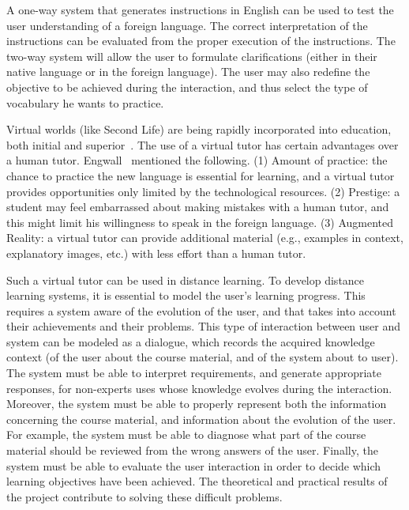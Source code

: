 A one-way system that generates instructions in English can be used to test the
user understanding of a foreign language. The correct interpretation of the
instructions can be evaluated from the proper execution of the instructions. The
two-way system will allow the user to formulate clarifications (either in their
native language or in the foreign language). The user may also redefine the
objective to be achieved during the interaction, and thus select the type of
vocabulary he wants to practice.

Virtual worlds (like Second Life) are being rapidly incorporated into
education, both initial and superior~\cite{Doswell05,molk:lear09}. The use of a
virtual tutor has certain advantages over a human tutor.
Engwall~ mentioned the following. (1) Amount of
practice: the chance to practice the new language is essential for learning, and
a virtual tutor provides opportunities only limited by the
technological resources. (2) Prestige: a student
may feel embarrassed about making mistakes with a human tutor, and this
might limit his willingness to speak in the foreign language. (3) Augmented
Reality: a virtual
tutor can provide additional material (e.g., examples in context, explanatory
images, etc.) with less effort than a human tutor.


Such a virtual tutor can be used in distance learning. To develop distance learning systems, it is essential to model the user's learning
progress. This requires a system aware of the evolution of the
user, and that takes into account their achievements and their problems. This type
of interaction between user and system can be modeled as a dialogue, which
records the acquired knowledge context (of the user about the course material, and
of the system about to user). The system must be able to interpret requirements, and generate
appropriate responses, for non-experts uses whose knowledge evolves during the
interaction. Moreover, the system must be able to properly represent both the
information concerning the course material, and information about the
evolution of the user. For example, the system must be able to diagnose what
part of the course material should be reviewed from the wrong answers of the
user. Finally, the system must be able to evaluate the user interaction in order
to decide which learning objectives have been achieved. The theoretical and practical
results of the project contribute to solving these difficult
problems.








